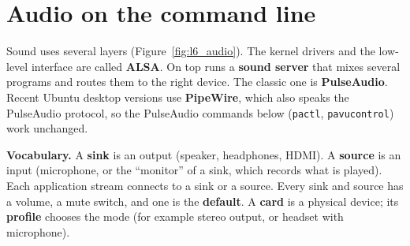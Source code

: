 \section*{Audio on the command line}
Sound uses several layers (Figure~\ref{fig:l6_audio}). The kernel drivers and the low-level interface are called \textbf{ALSA}. On top runs a \textbf{sound server} that mixes several programs and routes them to the right device. The classic one is \textbf{PulseAudio}. Recent Ubuntu desktop versions use \textbf{PipeWire}, which also speaks the PulseAudio protocol, so the PulseAudio commands below (\texttt{pactl}, \texttt{pavucontrol}) work unchanged.

\begin{center}
\label{fig:l6_audio}
\end{center}

\textbf{Vocabulary.} A \textbf{sink} is an output (speaker, headphones, HDMI). A \textbf{source} is an input (microphone, or the ``monitor'' of a sink, which records what is played). Each application stream connects to a sink or a source. Every sink and source has a volume, a mute switch, and one is the \textbf{default}. A \textbf{card} is a physical device; its \textbf{profile} chooses the mode (for example stereo output, or headset with microphone).

